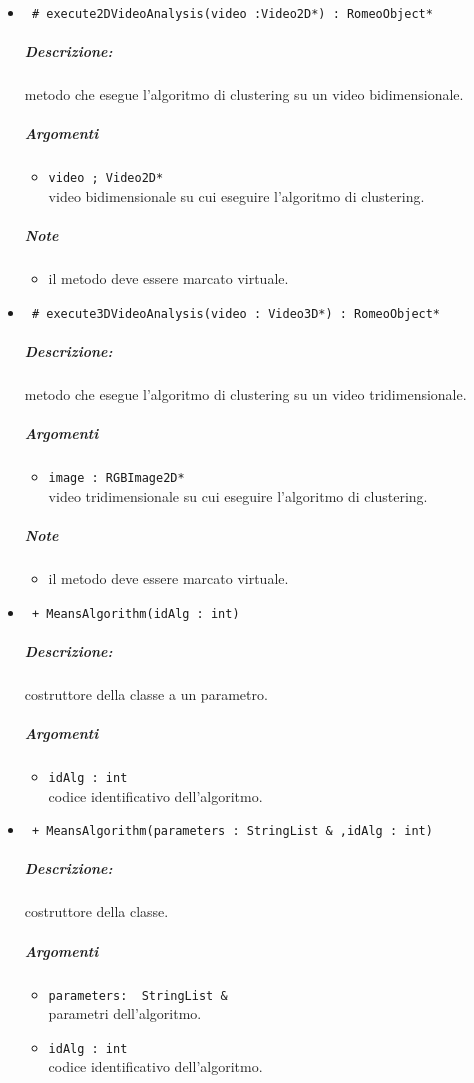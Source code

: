 \begin{itemize}
		\item \color{blue}\verb! # execute2DVideoAnalysis(video :Video2D*) : RomeoObject* !\\
			\color{black}
			\subparagraph{Descrizione:} metodo che esegue l'algoritmo di clustering su un video bidimensionale.
			\subparagraph{Argomenti}
				\begin{itemize}
					\item \color{RoyalPurple}\verb!video ; Video2D* !\\
					\color{black} video bidimensionale su cui eseguire l'algoritmo di clustering.
				\end{itemize}
				\subparagraph{Note}
				\begin{itemize}
					\item il metodo deve essere marcato virtuale.
				\end{itemize}
		\item \color{blue}\verb! # execute3DVideoAnalysis(video : Video3D*) : RomeoObject* !\\
			\color{black}
			\subparagraph{Descrizione:} metodo che esegue l'algoritmo di clustering su un video tridimensionale.
			\subparagraph{Argomenti}
				\begin{itemize}
					\item \color{RoyalPurple}\verb!image : RGBImage2D*!\\
					\color{black} video tridimensionale su cui eseguire l'algoritmo di clustering.
				\end{itemize}
				\subparagraph{Note}
			\begin{itemize}
				\item il metodo deve essere marcato virtuale.
			\end{itemize}

		\item \color{blue}\verb! + MeansAlgorithm(idAlg : int)!\\
			\color{black}
			\subparagraph{Descrizione:} costruttore della classe a un parametro.
			\subparagraph{Argomenti}
				\begin{itemize}
					\item \color{RoyalPurple}\verb!idAlg : int!\\
					\color{black} codice identificativo dell'algoritmo.
				\end{itemize}			
		
		\item \color{blue}\verb! + MeansAlgorithm(parameters : StringList & ,idAlg : int)!\\
			\color{black}
			\subparagraph{Descrizione:} costruttore della classe.
			\subparagraph{Argomenti}
				\begin{itemize}
					\item \color{RoyalPurple}\verb!parameters:  StringList &  !\\
					\color{black} parametri dell'algoritmo.
					\item \color{RoyalPurple}\verb!idAlg : int!\\
					\color{black} codice identificativo dell'algoritmo.
				\end{itemize}
		

\end{itemize}
